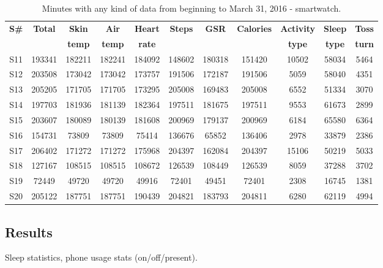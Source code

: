 \documentclass[12pt]{article} %
\begin{document}
\begin{table}[H]
\center
\begin{footnotesize}
	\begin{tabular}{| c | c | c | c | c | c | c | c | c | c | c |}
	\hline
	\textbf{S\#} & \textbf{Total} & \textbf{Skin} & \textbf{Air} & \textbf{Heart} & \textbf{Steps} & \textbf{GSR} & \textbf{Calories} & \textbf{Activity} & \textbf{Sleep} & \textbf{Toss}\\
	 & & \textbf{temp} & \textbf{temp} & \textbf{rate} & & & & \textbf{type} & \textbf{type} & \textbf{turn}\\
	
	\hline
	S11 & 193341 & 182211 & 182241 & 184092 & 148602 & 180318 & 151420 & 10502 & 58034 & 5464\\
	\hline
	S12 & 203508 & 173042 & 173042 & 173757 & 191506 & 172187 & 191506 & 5059 & 58040 & 4351 \\
	\hline
	S13 & 205205 & 171705 & 171705 & 173295 & 205008 & 169483 & 205008 & 6552 & 51334 & 3070\\
	\hline
	S14 & 197703 & 181936 & 181139 & 182364 & 197511 & 181675 & 197511 & 9553 & 61673 & 2899 \\
	\hline
	S15 & 203607 & 180089 & 180139 & 181608 & 200969 & 179137 & 200969 & 6184 & 65580 & 6364 \\
	\hline
	S16 & 154731 & 73809 & 73809 & 75414 &136676 & 65852 & 136406 & 2978 & 33879 & 2386\\
	\hline
	S17 & 206402 & 171272 & 171272 & 175968 & 204397 & 162084 & 204397 & 15106 & 50219 & 5033\\
	\hline
	S18 & 127167 & 108515 &108515 & 108672 & 126539 & 108449 & 126539 & 8059 & 37288 & 3702 \\
	\hline
	S19 & 72449 & 49720 & 49720 & 49916 & 72401 & 49451 & 72401 & 2308 & 16745 & 1381 \\
	\hline
	S20 & 205122 & 187751 & 187751 & 190439 & 204821 & 183793 & 204811 & 6280 & 62119 & 4994\\
	\hline
	\end{tabular}
	\caption{Minutes with any kind of data from beginning to March 31, 2016 - smartwatch.}
	\label{tab:totalMinutesWatch}
\end{footnotesize}
\end{table}

\subsection{Results}
Sleep statistics, phone usage stats (on/off/present). 
\end{document}
